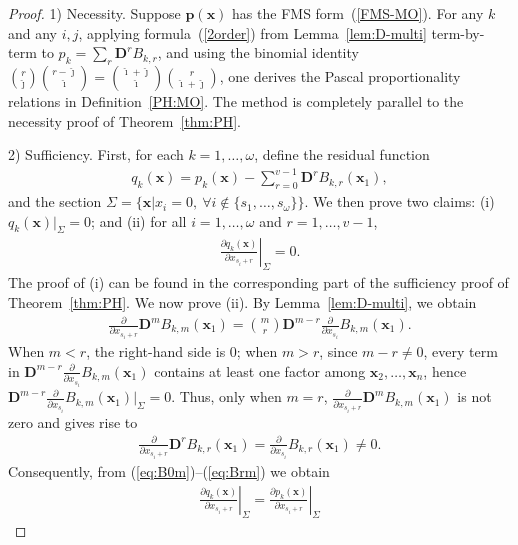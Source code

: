 \documentclass[11pt]{article}
\begin{document}
\begin{proof}
	1) Necessity. Suppose $\bm{p}(\bm{x})$ has the FMS form~(\ref{FMS-MO}). For any $k$ and any $i,j$, applying formula~(\ref{2order}) from Lemma~\ref{lem:D-multi} term-by-term to $p_k=\sum_r\bm{D}^r B_{k,r}$, and using the binomial identity $\binom{r}{\hat{\jmath}}\binom{r-\hat{\jmath}}{\hat{\imath}}=\binom{\hat{\imath}+\hat{\jmath}}{\hat{\imath}}\binom{r}{\hat{\imath}+\hat{\jmath}}$, one derives the Pascal proportionality relations in Definition~\ref{PH:MO}. The method is completely parallel to the necessity proof of Theorem~\ref{thm:PH}.
	
	2) Sufficiency. First, for each $k=1,\ldots,\omega$, define the residual function
	\begin{align}
		q_k(\bm{x})=p_k(\bm{x})-\sum_{r=0}^{v-1}\bm{D}^r B_{k,r}(\bm{x}_1),
	\end{align}
	and the section $\Sigma=\{\bm{x}\big| x_i=0,~\forall i\notin \{s_1,\ldots,s_\omega\}\}$. We then prove two claims: (i) $q_k(\bm{x})\big|_\Sigma=0$; and (ii) for all $i=1,\ldots,\omega$ and $r=1,\ldots,v-1$,
	\begin{align}
		\left.\frac{\partial q_k(\bm{x})}{\partial x_{s_i+r}}\right|_{\Sigma}=0.
	\end{align}
	The proof of (i) can be found in the corresponding part of the sufficiency proof of Theorem~\ref{thm:PH}. We now prove (ii). By Lemma~\ref{lem:D-multi}, we obtain
	\begin{align}
		\frac{\partial}{\partial x_{s_i+r}}\bm{D}^mB_{k,m}(\bm{x}_1)=\binom{m}{r}\bm{D}^{m-r}\frac{\partial}{\partial x_{s_i}}B_{k,m}(\bm{x}_1).
	\end{align}
	When $m<r$, the right-hand side is $0$; when $m>r$, since $m-r\neq0$, every term in $\bm{D}^{m-r}\frac{\partial}{\partial x_{s_i}}B_{k,m}(\bm{x}_1)$ contains at least one factor among $\bm{x}_2,\ldots,\bm{x}_n$, hence $\bm{D}^{m-r}\frac{\partial}{\partial x_{s_i}}B_{k,m}(\bm{x}_1)\big|_\Sigma=0$. Thus, only when $m=r$, $\frac{\partial}{\partial x_{s_i+r}}\bm{D}^mB_{k,m}(\bm{x}_1)$ is not zero and gives rise to
	\begin{align}
		\frac{\partial}{\partial x_{s_i+r}}\bm{D}^rB_{k,r}(\bm{x}_1)=\frac{\partial}{\partial x_{s_i}}B_{k,r}(\bm{x}_1)\neq 0.
	\end{align}
	Consequently, from (\ref{eq:B0m})--(\ref{eq:Brm}) we obtain
	\begin{align}
		\left.\frac{\partial q_k(\bm{x})}{\partial x_{s_i+r}}\right|_{\Sigma}
		=\left.\frac{\partial p_k(\bm{x})}{\partial x_{s_i+r}}\right|_{\Sigma}

\end{align}
\end{proof}
\end{document}
